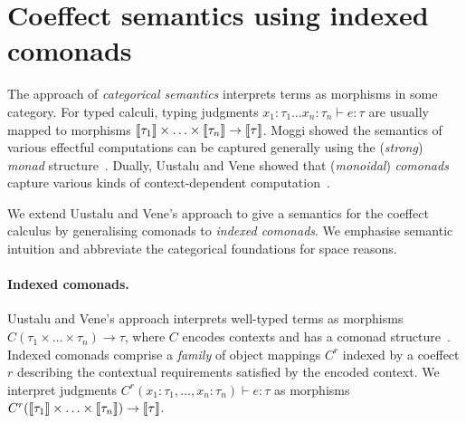 
\section{Coeffect semantics using indexed comonads}
\label{sec:comonads}

The approach of \emph{categorical semantics} interprets terms as
morphisms in some category.  For typed calculi, typing judgments $x_1 : \tau_1 \ldots x_n : \tau_n
\vdash e: \tau$ are usually mapped to morphisms $\llbracket \tau_1 \rrbracket \times \ldots \times
\llbracket \tau_n \rrbracket \rightarrow \llbracket \tau \rrbracket$. Moggi showed the semantics of various effectful 
computations can be captured generally using the (\emph{strong}) \emph{monad}
structure~\cite{monad-notions}. Dually, Uustalu and Vene showed that
(\emph{monoidal}) \emph{comonads} capture various kinds of context-dependent 
computation~\cite{comonads-notions}.

We extend Uustalu and Vene's approach to give a semantics for
the coeffect calculus by generalising comonads to
\emph{indexed comonads}. We emphasise semantic intuition and
abbreviate the categorical foundations for space reasons.

\vspace{-1em}
\paragraph{Indexed comonads.}

Uustalu and Vene's approach interprets well-typed terms 
as morphisms $C (\tau_1 \times \ldots
\times \tau_n) \rightarrow \tau$, where $C$ encodes contexts
and has a comonad structure~\cite{comonads-notions}.
Indexed comonads comprise a \emph{family} of object mappings 
$C^r$ indexed by a coeffect $r$ describing the contextual requirements satisfied by
the encoded context. We interpret judgments $C^r (x_1 : \tau_1, \ldots, x_n : \tau_n) \vdash e : \tau$ as
morphisms $C^r (\llbracket \tau_1 \rrbracket \times \ldots \times \llbracket \tau_n \rrbracket) \rightarrow \llbracket \tau \rrbracket$.

